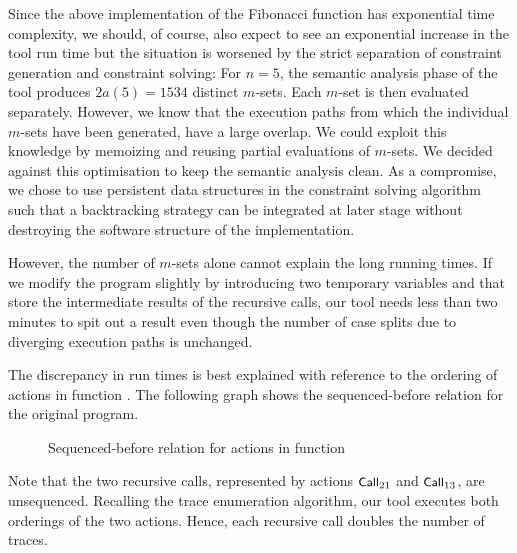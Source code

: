 \documentclass[a4paper,12pt]{scrbook}
\theoremstyle{plain}
\theoremstyle{definition}
\newcommand{\sem}[1]{{\small{\textsf{#1}}}}
\newcommand{\cc}[1]{{\text{\footnotesize\ttfamily{#1}}}}
\begin{document}
Since the above implementation of the Fibonacci function has exponential time
complexity, we should, of course, also expect to see an exponential increase in
the tool run time but the situation is worsened by the strict separation of
constraint generation and constraint solving: For $n = 5$, the semantic analysis
phase of the tool produces $2a(5) = 1534$ distinct $m$-sets. Each $m$-set is
then evaluated separately. However, we know that the execution paths from which
the individual $m$-sets have been generated, have a large overlap. We could
exploit this knowledge by memoizing and reusing partial evaluations of
$m$-sets. We decided against this optimisation to keep the semantic analysis
clean. As a compromise, we chose to use persistent data structures in the
constraint solving algorithm such that a backtracking strategy can be integrated
at later stage without destroying the software structure of the implementation.

However, the number of $m$-sets alone cannot explain the long running times. If
we modify the program slightly by introducing two temporary variables \cc{x} and
\cc{y} that store the intermediate results of the recursive calls, our tool
needs less than two minutes to spit out a result even though the number of case
splits due to diverging execution paths is unchanged.


The discrepancy in run times is best explained with reference to the ordering of
actions in function \cc{fib}. The following graph shows the sequenced-before
relation for the original program.
\begin{figure}[htb]
\centering
\caption{Sequenced-before relation for actions in function \cc{fib}}
\label{fibFib}
\end{figure}
Note that the two recursive calls, represented by actions $\sem{Call}_{21}$ and
$\sem{Call}_{13}$, are unsequenced. Recalling the trace enumeration algorithm,
our tool executes both orderings of the two actions. Hence, each recursive call
doubles the number of traces.
\end{document}
